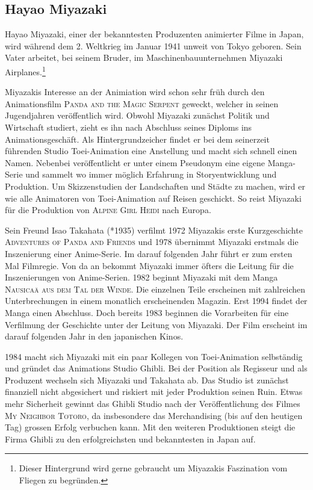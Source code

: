 \subsection{Hayao Miyazaki}
Hayao Miyazaki, einer der bekanntesten Produzenten animierter Filme in Japan, wird während dem 2. Weltkrieg im Januar 1941 unweit von Tokyo geboren. Sein Vater arbeitet, bei seinem Bruder, im Maschinenbauunternehmen Miyazaki Airplanes.\footnote{Dieser Hintergrund wird gerne gebraucht um Miyazakis Faszination vom Fliegen zu begründen.} 

Miyazakis Interesse an der Animiation wird schon sehr früh durch den Animationsfilm \textsc{Panda and the Magic Serpent} geweckt, welcher in seinen Jugendjahren veröffentlich wird. Obwohl Miyazaki zunächst Politik und Wirtschaft studiert, zieht es ihn nach Abschluss seines Diploms ins Animationsgeschäft. Als Hintergrundzeicher findet er bei dem seinerzeit führenden Studio Toei-Animation eine Anstellung und macht sich schnell einen Namen. Nebenbei veröffentlicht er unter einem Pseudonym eine eigene Manga-Serie und sammelt wo immer möglich Erfahrung in Storyentwicklung und Produktion. Um Skizzenstudien der Landschaften und Städte zu machen, wird er wie alle Animatoren von Toei-Animation auf Reisen geschickt. So reist Miyazaki für die Produktion von \textsc{Alpine Girl Heidi} nach Europa.

Sein Freund Isao Takahata (*1935) verfilmt 1972 Miyazakis erste Kurzgeschichte \textsc{Adventures of Panda and Friends} und 1978 übernimmt Miyazaki erstmals die Inszenierung einer Anime-Serie. Im darauf folgenden Jahr führt er zum ersten Mal Filmregie. Von da an bekommt Miyazaki immer öfters die Leitung für die Inszenierungen von Anime-Serien. 1982 beginnt Miyazaki mit dem Manga \textsc{Nausicaä aus dem Tal der Winde}. Die einzelnen Teile erscheinen mit zahlreichen Unterbrechungen in einem monatlich erscheinenden Magazin. Erst 1994 findet der Manga einen Abschluss. Doch bereits 1983 beginnen die Vorarbeiten für eine Verfilmung der Geschichte unter der Leitung von Miyazaki. Der Film erscheint im darauf folgenden Jahr in den japanischen Kinos. 

1984 macht sich Miyazaki mit ein paar Kollegen von Toei-Animation selbständig und gründet das Animations Studio Ghibli. Bei der Position als Regisseur und als Produzent wechseln sich Miyazaki und Takahata ab. Das Studio ist zunächst finanziell nicht abgesichert und riskiert mit jeder Produktion seinen Ruin. Etwas mehr Sicherheit gewinnt das Ghibli Studio nach der Veröffentlichung des Filmes \textsc{My Neighbor Totoro}, da insbesondere das Merchandising (bis auf den heutigen Tag) grossen Erfolg verbuchen kann. Mit den weiteren Produktionen steigt die Firma Ghibli zu den erfolgreichsten und bekanntesten in Japan auf. 

